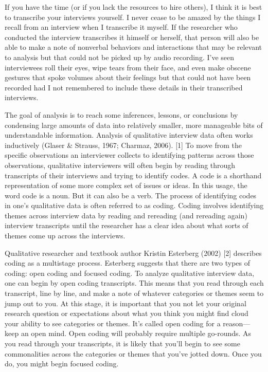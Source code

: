 If you have the time (or if you lack the resources to hire others), I think it is best to transcribe your interviews yourself. I never cease to be amazed by the things I recall from an interview when I transcribe it myself. If the researcher who conducted the interview transcribes it himself or herself, that person will also be able to make a note of nonverbal behaviors and interactions that may be relevant to analysis but that could not be picked up by audio recording. I’ve seen interviewees roll their eyes, wipe tears from their face, and even make obscene gestures that spoke volumes about their feelings but that could not have been recorded had I not remembered to include these details in their transcribed interviews.

The goal of analysis is to reach some inferences, lessons, or conclusions by condensing large amounts of data into relatively smaller, more manageable bits of understandable information. Analysis of qualitative interview data often works inductively (Glaser \& Strauss, 1967; Charmaz, 2006). [1] To move from the specific observations an interviewer collects to identifying patterns across those observations, qualitative interviewers will often begin by reading through transcripts of their interviews and trying to identify codes. A code is a shorthand representation of some more complex set of issues or ideas. In this usage, the word code is a noun. But it can also be a verb. The process of identifying codes in one’s qualitative data is often referred to as coding. Coding involves identifying themes across interview data by reading and rereading (and rereading again) interview transcripts until the researcher has a clear idea about what sorts of themes come up across the interviews.

Qualitative researcher and textbook author Kristin Esterberg (2002) [2] describes coding as a multistage process. Esterberg suggests that there are two types of coding: open coding and focused coding. To analyze qualitative interview data, one can begin by open coding transcripts. This means that you read through each transcript, line by line, and make a note of whatever categories or themes seem to jump out to you. At this stage, it is important that you not let your original research question or expectations about what you think you might find cloud your ability to see categories or themes. It’s called open coding for a reason—keep an open mind. Open coding will probably require multiple go-rounds. As you read through your transcripts, it is likely that you’ll begin to see some commonalities across the categories or themes that you’ve jotted down. Once you do, you might begin focused coding.

